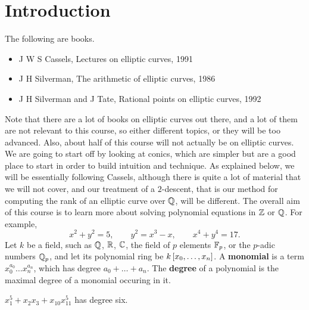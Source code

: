 \def\module{M4P32 Number Theory: Elliptic Curves}
\def\lecturer{Prof Toby Gee}
\def\term{Autumn 2019}
\def\cover{}
\def\syllabus{}
\def\thm{section}







\setcounter{section}{0}

\section{Introduction}


The following are books.
\begin{itemize}
\item J W S Cassels, Lectures on elliptic curves, 1991
\item J H Silverman, The arithmetic of elliptic curves, 1986
\item J H Silverman and J Tate, Rational points on elliptic curves, 1992
\end{itemize}
Note that there are a lot of books on elliptic curves out there, and a lot of them are not relevant to this course, so either different topics, or they will be too advanced. Also, about half of this course will not actually be on elliptic curves. We are going to start off by looking at conics, which are simpler but are a good place to start in order to build intuition and technique. As explained below, we will be essentially following Cassels, although there is quite a lot of material that we will not cover, and our treatment of a $ 2 $-descent, that is our method for computing the rank of an elliptic curve over $ \mathbb{Q} $, will be different. The overall aim of this course is to learn more about solving polynomial equations in $ \mathbb{Z} $ or $ \mathbb{Q} $. For example,
$$ x^2 + y^2 = 5, \qquad y^2 = x^3 - x, \qquad x^4 + y^4 = 17. $$
Let $ k $ be a field, such as $ \mathbb{Q} $, $ \mathbb{R} $, $ \mathbb{C} $, the field of $ p $ elements $ \mathbb{F}_p $, or the $ p $-adic numbers $ \mathbb{Q}_p $, and let its polynomial ring be $ k\sbr{x_0, \dots, x_n} $. A \textbf{monomial} is a term $ x_0^{a_0}\dots x_n^{a_n} $, which has degree $ a_0 + \dots + a_n $. The \textbf{degree} of a polynomial is the maximal degree of a monomial occuring in it.

\begin{example*}
$ x_1^5 + x_2x_3 + x_{10}x_{11}^5 $ has degree six.
\end{example*}

